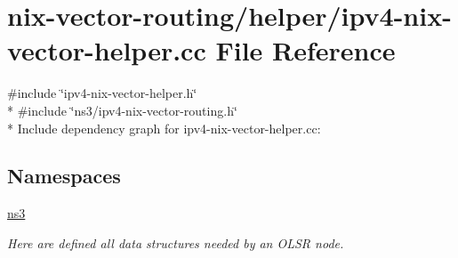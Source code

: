 \hypertarget{ipv4-nix-vector-helper_8cc}{}\section{nix-\/vector-\/routing/helper/ipv4-\/nix-\/vector-\/helper.cc File Reference}
\label{ipv4-nix-vector-helper_8cc}
{\ttfamily \#include \char`\"{}ipv4-\/nix-\/vector-\/helper.\+h\char`\"{}}\\*
{\ttfamily \#include \char`\"{}ns3/ipv4-\/nix-\/vector-\/routing.\+h\char`\"{}}\\*
Include dependency graph for ipv4-\/nix-\/vector-\/helper.cc\+:
\subsection*{Namespaces}
\begin{DoxyCompactItemize}
\item 
 \hyperlink{namespacens3}{ns3}
\begin{DoxyCompactList}\small\item\em Here are defined all data structures needed by an O\+L\+SR node. \end{DoxyCompactList}\end{DoxyCompactItemize}
